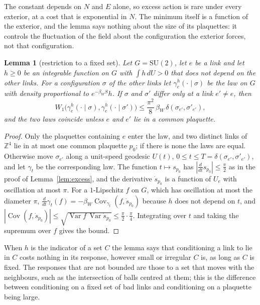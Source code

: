 \documentclass[11pt]{amsart}
\newtheorem{lemma}[theorem]{Lemma}
\theoremstyle{definition}
\theoremstyle{remark}
\numberwithin{equation}{section}
\newcommand{\Z}{\mathbb{Z}}
\newcommand{\SU}{\mathrm{SU}}
\newcommand{\Cov}{\operatorname{Cov}}
\newcommand{\Var}{\operatorname{Var}}
\begin{document}
The constant depends on $N$ and $E$ alone, so excess action is rare under
every exterior, at a cost that is exponential in $N$. The minimum itself is
a function of the exterior, and the lemma says nothing about the size of
its plaquettes: it controls the fluctuation of the field about the
configuration the exterior forces, not that configuration.

\begin{lemma}[restriction to a fixed set]\label{lem:fixedset}
Let $G=\SU(2)$, let $e$ be a link and let $h\ge0$ be an integrable function
on $G$ with $\int h\,dU>0$ that does not depend on the other links. For a
configuration $\sigma$ of the other links let $\gamma^h_e(\cdot\mid\sigma)$
be the law on $G$ with density proportional to $e^{-\beta_WS}h$. If
$\sigma$ and $\sigma'$ differ only at a link $e'\ne e$, then
\[
W_1\bigl(\gamma^h_e(\cdot\mid\sigma),\gamma^h_e(\cdot\mid\sigma')\bigr)\le
\frac{\pi^2}8\,\beta_W\,\delta(\sigma_{e'},\sigma'_{e'}),
\]
and the two laws coincide unless $e$ and $e'$ lie in a common plaquette.
\end{lemma}

\begin{proof}
Only the plaquettes containing $e$ enter the law, and two distinct links of
$\Z^4$ lie in at most one common plaquette $p_0$; if there is none the
laws are equal. Otherwise move $\sigma_{e'}$ along a unit-speed geodesic
$U(t)$, $0\le t\le T=\delta(\sigma_{e'},\sigma'_{e'})$, and let $\gamma_t$
be the corresponding law. The function $t\mapsto s_{p_0}$ has $|\frac d{dt}
s_{p_0}|\le\frac\pi2$ as in the proof of Lemma~\ref{lem:excess}, and the
derivative $\dot s_{p_0}$ is a function of $U_e$ with oscillation at most
$\pi$. For a $1$-Lipschitz $f$ on $G$, which has oscillation at most the
diameter $\pi$, $\frac d{dt}\gamma_t(f)=-\beta_W\Cov_{\gamma_t}(f,\dot
s_{p_0})$ because $h$ does not depend on $t$, and $|\Cov(f,\dot s_{p_0})|
\le\sqrt{\Var f\,\Var\dot s_{p_0}}\le\frac\pi2\cdot\frac\pi4$. Integrating
over $t$ and taking the supremum over $f$ gives the bound.
\end{proof}

When $h$ is the indicator of a set $C$ the lemma says that conditioning a
link to lie in $C$ costs nothing in its response, however small or
irregular $C$ is, as long as $C$ is fixed. The responses that are not
bounded are those to a set that moves with the neighbours, such as the
intersection of balls centred at them; this is the difference between
conditioning on a fixed set of bad links and conditioning on a plaquette
being large.
\end{document}
